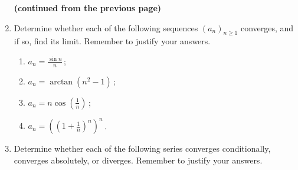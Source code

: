\documentclass[10pt]{article}
\begin{document}
\begin{enumerate}
\begin{center}
\textbf{(continued from the previous page)}
\end{center}

%
%
%
%
%
%
%
%
%

\item Determine whether each of the following sequences $(a_n)_{n\ge 1}$ converges, and if so, find its limit. Remember to justify your answers.

\begin{multicols}{2}
\begin{enumerate}

\item $\displaystyle a_n=\frac{\sin n}{n}$\,;

\item $\displaystyle a_n=\arctan(n^2-1)$\,;

\item $\displaystyle a_n=n\cos\left(\frac{1}{n}\right)$\,;

\item $\displaystyle a_n=\left(\left(1+\frac{1}{n}\right)^{\!n}\right)^{\!\!n}$\,.

\end{enumerate}
\end{multicols}

\item Determine whether each of the following series converges conditionally, converges absolutely, or diverges. Remember to justify your answers.


\end{enumerate}
\end{document}
